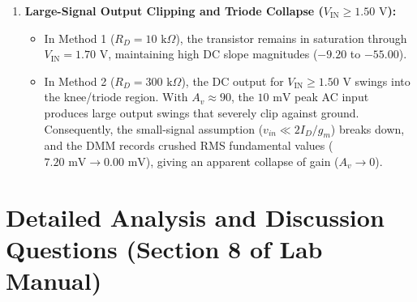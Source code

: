 \documentclass[11pt,a4paper]{article}
\begin{document}
\begin{enumerate}
    \item \textbf{Large-Signal Output Clipping and Triode Collapse ($V_{\text{IN}} \ge 1.50\text{ V}$):}
    \begin{itemize}
        \item In Method 1 ($R_D = 10\text{ k}\Omega$), the transistor remains in saturation through $V_{\text{IN}} = 1.70\text{ V}$, maintaining high DC slope magnitudes ($-9.20$ to $-55.00$).
        \item In Method 2 ($R_D = 300\text{ k}\Omega$), the DC output for $V_{\text{IN}} \ge 1.50\text{ V}$ swings into the knee/triode region. With $A_v \approx 90$, the $10\text{ mV}$ peak AC input produces large output swings that severely clip against ground. Consequently, the small-signal assumption ($v_{in} \ll 2I_D/g_m$) breaks down, and the DMM records crushed RMS fundamental values ($7.20\text{ mV} \to 0.00\text{ mV}$), giving an apparent collapse of gain ($A_v \to 0$).
    \end{itemize}
\end{enumerate}

\clearpage

\section{Detailed Analysis and Discussion Questions (Section 8 of Lab Manual)}
\end{document}
